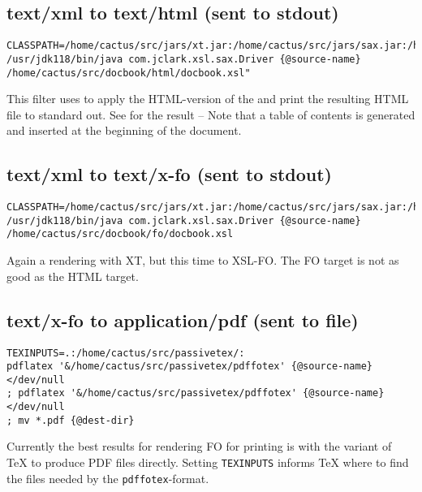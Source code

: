 \subsection*{text/xml to text/html (sent to stdout)}
{\footnotesize
\begin{verbatim}
CLASSPATH=/home/cactus/src/jars/xt.jar:/home/cactus/src/jars/sax.jar:/home/cactus/src/jars/xp.jar
/usr/jdk118/bin/java com.jclark.xsl.sax.Driver {@source-name} /home/cactus/src/docbook/html/docbook.xsl"
\end{verbatim}
}
This filter uses  to
apply the HTML-version of the
 and print the resulting HTML file to standard out.  See
 for the result --  Note that a table of
  contents is generated and inserted at the beginning of the document.  

\subsection*{text/xml to text/x-fo (sent to stdout)}
  {\footnotesize
\begin{verbatim}
CLASSPATH=/home/cactus/src/jars/xt.jar:/home/cactus/src/jars/sax.jar:/home/cactus/src/jars/xp.jar 
/usr/jdk118/bin/java com.jclark.xsl.sax.Driver {@source-name} /home/cactus/src/docbook/fo/docbook.xsl
\end{verbatim}
  }

Again a rendering with XT, but this time to XSL-FO.  The FO target is
not as good as the HTML target.

\subsection*{text/x-fo to application/pdf (sent to file)}
  {\footnotesize
\begin{verbatim}
TEXINPUTS=.:/home/cactus/src/passivetex/: 
pdflatex '&/home/cactus/src/passivetex/pdffotex' {@source-name}</dev/null
; pdflatex '&/home/cactus/src/passivetex/pdffotex' {@source-name}</dev/null
; mv *.pdf {@dest-dir}
\end{verbatim}
}

Currently the best results for rendering FO for printing is
 with the  variant of {\TeX} to produce
PDF files directly.     Setting \texttt{TEXINPUTS} informs {\TeX}
where to find the files needed by the \texttt{pdffotex}-format.

